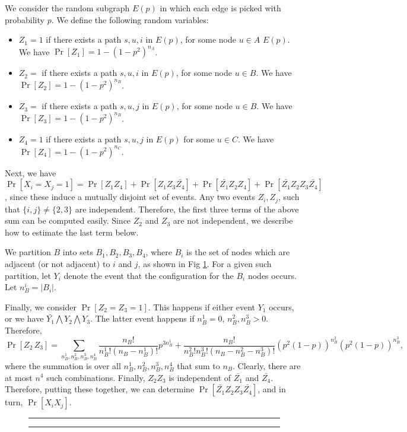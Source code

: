 We consider the random subgraph $E(p)$ in which each edge is picked with probability $p$.
We define the following random variables:
\begin{itemize}
\item
$Z_1=1$ if there exists a path $s, u, i$ in $E(p)$, for some node $u\in A$ $E(p)$.
We have $\Pr[Z_1]=1 - (1-p^2)^{n_A}$.
\item
$Z_2=$ if there exists a path $s, u, i$ in $E(p)$, for some node $u\in B$.
We have $\Pr[Z_2] = 1 - (1-p^2)^{n_B}$.
\item
$Z_3=$ if there exists a path $s, u, j$ in $E(p)$, for some node
$u\in B$. 
We have $\Pr[Z_3] = 1 - (1-p^2)^{n_B}$.
\item
$Z_4=1$ if there exists a path $s, u, j$ in $E(p)$ for some $u\in C$.
We have $\Pr[Z_4]=1 - (1-p^2)^{n_C}$.
\end{itemize}

Next, we have $\Pr[X_i=X_j=1]=\Pr[Z_1Z_4] + \Pr[Z_1Z_3\bar{Z_4}] + \Pr[\bar{Z_1}Z_2Z_4] + 
\Pr[\bar{Z_1}Z_2Z_3\bar{Z_4}]$, since these induce a mutually disjoint set of events.
Any two events $Z_i, Z_j$, such that $\{i, j\}\neq \{2, 3\}$ are independent.
Therefore, the first three terms of the above sum can be computed easily. Since
$Z_2$ and $Z_3$ are not independent, we describe how to estimate the last term below.

We partition $B$ into sets $B_1, B_2, B_3, B_4$, where $B_i$ is the set
of nodes which are adjacent (or not adjacent) to $i$ and $j$, as shown in Fig \ref{fig2}.
For a given such partition,
let $Y_i$ denote the event that the configuration for the $B_i$ nodes occurs.
Let $n^i_B=|B_i|$.


Finally, we consider $\Pr[Z_2=Z_3=1]$. This happens if either event $Y_1$ occurs, or
we have $\bar{Y_1}\bigwedge Y_2\bigwedge Y_3$. The latter event happens
if $n^1_B=0$, $n^2_B, n^3_B>0$.
Therefore, 
\[\Pr[Z_2\,Z_3] = \sum_{n^1_B, n^2_B, n^3_B, n^4_B} \frac{n_B!}{n^1_B! (n_B-n^1_B)!} p^{3n^1_B} +
                \frac{n_B!}{n^2_B! n^3_B!(n_B-n^2_B-n^3_B)!} 
                 (p^2(1-p))^{n^2_B}(p^2(1-p))^{n^3_B},
\]
where the summation is over all $n^1_B, n^2_B, n^3_B, n^4_B$ that sum to $n_B$.
Clearly, there are at most $n^4$ such combinations. Finally, $Z_2Z_3$ is independent
of $\bar{Z_1}$ and $\bar{Z_4}$. Therefore,
putting these together, we can determine $\Pr[\bar{Z_1}Z_2Z_3\bar{Z_4}]$, and
in turn, $\Pr[X_iX_j]$.
\QED

\begin{figure}
\rule{\textwidth}{0.01in}
\begin{center}

\end{center}
\caption{}
\label{fig2}
\rule{\textwidth}{0.01in}
\end{figure}

